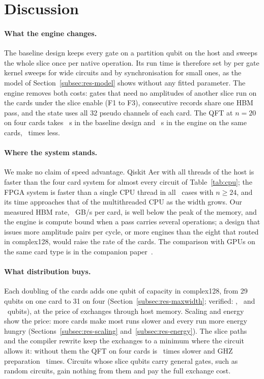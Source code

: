 \section{Discussion}\label{sec:discussion}

\paragraph{What the engine changes.} The baseline design keeps every gate on a partition qubit on the host and sweeps
the whole slice once per native operation. Its run time is therefore set by per gate kernel sweeps for wide circuits
and by synchronisation for small ones, as the model of Section~\ref{subsec:res-model} shows without any fitted
parameter. The engine removes both costs: gates that need no amplitudes of another slice run on the cards under
the slice enable (F1 to F3), consecutive records share one HBM pass, and the state uses all 32 pseudo channels of each
card. The QFT at $n=20$ on four cards takes \NumHostSubmittedQftTwenty~s in the baseline design and
\NumHostRevisedQftTwenty~s in the engine on the same cards, \NumSubmittedOverRevisedQftTwenty~times less.

\paragraph{Where the system stands.} We make no claim of speed advantage. Qiskit Aer with all threads of the host is
faster than the four card system for almost every circuit of Table~\ref{tab:cpu}; the FPGA system is faster than a
single CPU thread in all \NumCpuWideCases~cases with $n\ge 24$, and its time approaches that of the multithreaded CPU as
the width grows. Our measured HBM rate, \NumHbmPerCard~GB/s per card, is well below the peak of the memory, and the engine is compute bound
when a pass carries several operations; a design that issues more amplitude pairs per cycle, or more engines than the
eight that routed in complex128, would raise the rate of the cards. The comparison with GPUs on the same card type is in
the companion paper~\cite{tiwari2026fpga30}.

\paragraph{What distribution buys.} Each doubling of the cards adds one qubit of capacity in complex128, from 29 qubits on
one card to 31 on four (Section~\ref{subsec:res-maxwidth}; verified: \NumMaxWidthOneCard, \NumMaxWidthTwoCards~and
\NumMaxWidthFourCards~qubits), at the price of exchanges through host memory. Scaling and energy show the price:
more cards make most runs slower and every run more energy hungry (Sections~\ref{subsec:res-scaling}
and~\ref{subsec:res-energy}). The slice paths and the compiler rewrite keep the exchanges to a minimum where the circuit
allows it: without them the QFT on four cards is \NumAblQftFourAllOff~times slower and GHZ preparation
\NumAblGhzFourAllOff~times. Circuits whose slice qubits carry general gates, such as random circuits, gain nothing from
them and pay the full exchange cost.

